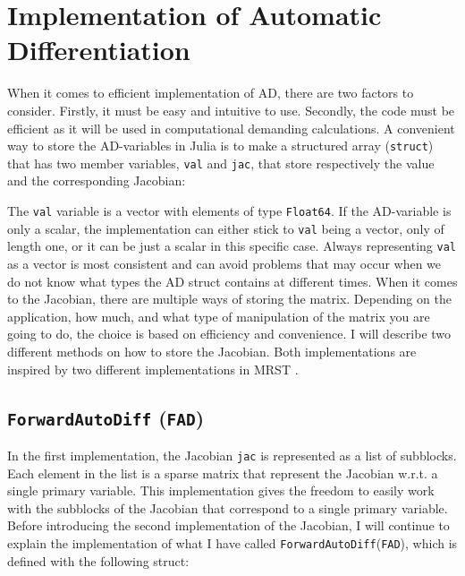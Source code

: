 \section{Implementation of Automatic Differentiation}
\label{sec:ImplementationAD}
When it comes to efficient implementation of AD, there are two factors to consider. Firstly, it must be easy and intuitive to use. Secondly, the code must be efficient as it will be used in computational demanding calculations. A convenient way to store the AD-variables in Julia is to make a structured array (\texttt{struct}) that has two member variables, \texttt{val} and \texttt{jac}, that store respectively the value and the corresponding Jacobian: 
 
The \texttt{val} variable is a vector with elements of type \texttt{Float64}. If the AD-variable is only a scalar, the implementation can either stick to \texttt{val} being a vector, only of length one, or it can be just a scalar in this specific case. Always representing \texttt{val} as a vector is most consistent and can avoid problems that may occur when we do not know what types the AD struct contains at different times. When it comes to the Jacobian, there are multiple ways of storing the matrix. Depending on the application, how much, and what type of manipulation of the matrix you are going to do, the choice is based on efficiency and convenience. I will describe two different methods on how to store the Jacobian. Both implementations are inspired by two different implementations in MRST \citep{lieMrstUrl}. 

\subsection{\texttt{ForwardAutoDiff} (\texttt{FAD})}
\label{sec:FAD}
In the first implementation, the Jacobian \texttt{jac} is represented as a list of subblocks. Each element in the list is a sparse matrix that represent the Jacobian w.r.t. a single primary variable. This implementation gives the freedom to easily work with the subblocks of the Jacobian that correspond to a single primary variable. Before introducing the second implementation of the Jacobian, I will continue to explain the implementation of what I have called \texttt{ForwardAutoDiff}(\texttt{FAD}), which is defined with the following struct:



